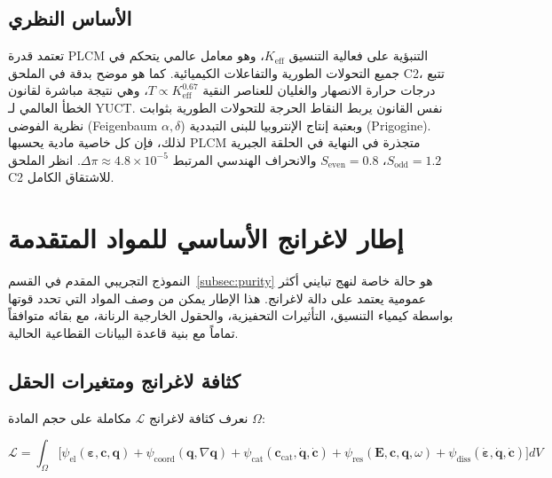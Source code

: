 \documentclass[11pt,a4paper]{article}
\begin{document}
	\begin{otherlanguage}{arabic}
		
		\subsection{الأساس النظري}
		
		تعتمد قدرة PLCM التنبؤية على فعالية التنسيق $K_{\mathrm{eff}}$، وهو معامل عالمي يتحكم في جميع التحولات الطورية والتفاعلات الكيميائية. كما هو موضح بدقة في الملحق C2، تتبع درجات حرارة الانصهار والغليان للعناصر النقية $T \propto K_{\mathrm{eff}}^{0.67}$، وهي نتيجة مباشرة لقانون الخطأ العالمي لـ YUCT. نفس القانون يربط النقاط الحرجة للتحولات الطورية بثوابت نظرية الفوضى (Feigenbaum $\alpha,\delta$) وبعتبة إنتاج الإنتروبيا للبنى التبددية (Prigogine). لذلك، فإن كل خاصية مادية يحسبها PLCM متجذرة في النهاية في الحلقة الجبرية $S_{\mathrm{odd}}=1.2$، $S_{\mathrm{even}}=0.8$ والانحراف الهندسي المرتبط $\Delta\pi \approx 4.8\times10^{-5}$. انظر الملحق C2 للاشتقاق الكامل.
		
		\section{إطار لاغرانج الأساسي للمواد المتقدمة}
		\label{sec:lagrangian}
		
		النموذج التجريبي المقدم في القسم~\ref{subsec:purity} هو حالة خاصة لنهج تبايني أكثر عمومية يعتمد على دالة لاغرانج. هذا الإطار يمكن من وصف المواد التي تحدد قوتها بواسطة كيمياء التنسيق، التأثيرات التحفيزية، والحقول الخارجية الرنانة، مع بقائه متوافقاً تماماً مع بنية قاعدة البيانات القطاعية الحالية.
		
		\subsection{كثافة لاغرانج ومتغيرات الحقل}
		\label{subsec:lagrangian-density}
		
		نعرف كثافة لاغرانج \(\mathcal{L}\) مكاملة على حجم المادة \(\Omega\):
		
		\[
		\mathcal{L} = \int_{\Omega} \Big[ 
		\psi_{\mathrm{el}}(\boldsymbol{\varepsilon}, \mathbf{c}, \mathbf{q}) 
		+ \psi_{\mathrm{coord}}(\mathbf{q}, \nabla\mathbf{q}) 
		+ \psi_{\mathrm{cat}}(\mathbf{c}_{\mathrm{cat}}, \dot{\mathbf{q}}, \dot{\mathbf{c}}) 
		+ \psi_{\mathrm{res}}(\mathbf{E}, \mathbf{c}, \mathbf{q}, \omega) 
		+ \psi_{\mathrm{diss}}(\dot{\boldsymbol{\varepsilon}}, \dot{\mathbf{q}}, \dot{\mathbf{c}})
		\Big] dV
		\]
		

\end{otherlanguage}
\end{document}
